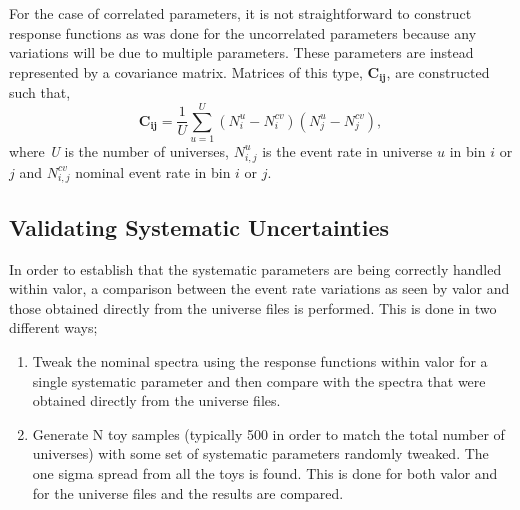 For the case of correlated parameters, it is not straightforward to construct response functions as was done for the uncorrelated parameters because any variations will be due to multiple parameters. These parameters are instead represented by a covariance matrix. Matrices of this type, $\mathbf{C_{ij}}$, are constructed such that,
\begin{equation}
  \mathbf{C_{ij}} = \frac{1}{U} \sum_{u=1}^{U} (N_{i}^{u}-N_{i}^{cv})(N_{j}^{u}-N_{j}^{cv}),
  \label{eq:covmatrix}
\end{equation}
where \textit{U} is the number of universes, $N_{i,j}^{u}$ is the event rate in universe $u$ in bin $i$ or $j$ and $N_{i,j}^{cv}$ nominal event rate in
bin $i$ or $j$.

\subsection{Validating Systematic Uncertainties}
In order to establish that the systematic parameters are being correctly handled within \gls{valor}, a comparison between the event rate variations as seen by \gls{valor} and those obtained directly from the universe files is performed. This is done in two different ways; 
\begin{enumerate}
    \item Tweak the nominal spectra using the response functions within \gls{valor} for a single systematic parameter and then compare with the spectra that were obtained directly from the universe files.
    \item Generate N toy samples (typically 500 in order to match the total number of universes) with some set of systematic parameters randomly tweaked. The one sigma spread from all the toys is found. This is done for both \gls{valor} and for the universe files and the results are compared. 
\end{enumerate}

